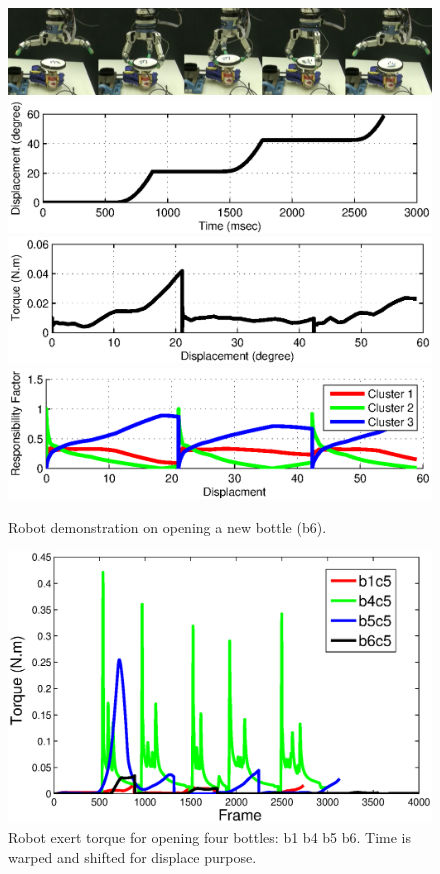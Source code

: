 \begin{figure}
  \centering
  \includegraphics[width=15cm]{./fig_cha4/demo_b6.jpg}
  \includegraphics[width=15cm]{./fig_cha4/demo_b6_s.eps}
  \includegraphics[width=15cm]{./fig_cha4/demo_b6_T.eps}
  \includegraphics[width=15cm]{./fig_cha4/demo_b6_rf.eps}
  \caption{ \scriptsize{Robot demonstration on opening a new bottle (b6).}
}
\label{fig:demo_b6}
\end{figure}


\begin{figure}
  \centering
  \includegraphics[width=12cm]{./fig_cha4/rb1b4b5b6_time_T.eps}
  \caption{ \scriptsize{Robot exert torque for opening four bottles: b1 b4 b5 b6. Time is warped and shifted for displace purpose.}
}
\label{fig:demo_b1b4b5b6}
\end{figure}


